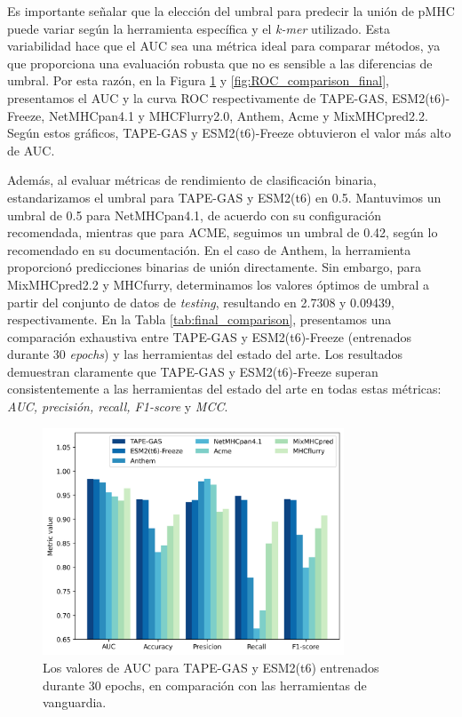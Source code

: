 Es importante señalar que la elección del umbral para predecir la unión de pMHC puede variar según la herramienta específica y el \textit{k-mer} utilizado. Esta variabilidad hace que el AUC sea una métrica ideal para comparar métodos, ya que proporciona una evaluación robusta que no es sensible a las diferencias de umbral. Por esta razón, en la Figura \ref{fig:comparison_final} y \ref{fig:ROC_comparison_final}, presentamos el AUC y la curva ROC respectivamente de TAPE-GAS, ESM2(t6)-Freeze, NetMHCpan4.1 y MHCFlurry2.0, Anthem, Acme y MixMHCpred2.2. Según estos gráficos, TAPE-GAS y ESM2(t6)-Freeze obtuvieron el valor más alto de AUC.

Además, al evaluar métricas de rendimiento de clasificación binaria, estandarizamos el umbral para TAPE-GAS y ESM2(t6) en 0.5. Mantuvimos un umbral de 0.5 para NetMHCpan4.1, de acuerdo con su configuración recomendada, mientras que para ACME, seguimos un umbral de 0.42, según lo recomendado en su documentación. En el caso de Anthem, la herramienta proporcionó predicciones binarias de unión directamente. Sin embargo, para MixMHCpred2.2 y MHCfurry, determinamos los valores óptimos de umbral a partir del conjunto de datos de \textit{testing}, resultando en 2.7308 y 0.09439, respectivamente. En la Tabla \ref{tab:final_comparison}, presentamos una comparación exhaustiva entre TAPE-GAS y ESM2(t6)-Freeze (entrenados durante 30 \textit{epochs}) y las herramientas del estado del arte. Los resultados demuestran claramente que TAPE-GAS y ESM2(t6)-Freeze superan consistentemente a las herramientas del estado del arte en todas estas métricas: \textit{AUC, precisión, recall, F1-score} y \textit{MCC}.

\begin{figure}
	\centering
	\includegraphics[width=0.8\textwidth]{img/results/metrics_comparison}
	\caption[Comparación del AUC con métodos del estado del arte]{Los valores de AUC para TAPE-GAS y ESM2(t6) entrenados durante 30 epochs, en comparación con las herramientas de vanguardia.}
	\label{fig:comparison_final}
\end{figure}


